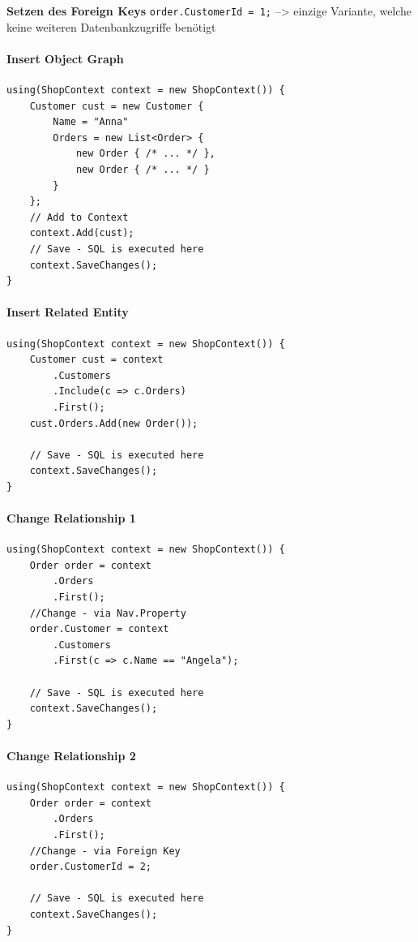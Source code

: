 \documentclass[
a4paper,
oneside,
10pt,
fleqn,
headsepline,
toc=listofnumbered, 
bibliography=totocnumbered]{scrartcl}
\begin{document}
\textbf{Setzen des Foreign Keys}
\lstinline{order.CustomerId = 1;}
--> einzige Variante, welche keine weiteren Datenbankzugriffe benötigt

\paragraph{Insert Object Graph}
\begin{lstlisting}
using(ShopContext context = new ShopContext()) {
    Customer cust = new Customer {
        Name = "Anna"
        Orders = new List<Order> {
            new Order { /* ... */ },
            new Order { /* ... */ }
        }
    };
    // Add to Context
    context.Add(cust);
    // Save - SQL is executed here
    context.SaveChanges();
}
\end{lstlisting}

\paragraph{Insert Related Entity}
\begin{lstlisting}
using(ShopContext context = new ShopContext()) {
    Customer cust = context
        .Customers
        .Include(c => c.Orders)
        .First();
    cust.Orders.Add(new Order());
    
    // Save - SQL is executed here
    context.SaveChanges();
}
\end{lstlisting}

\paragraph{Change Relationship 1}
\begin{lstlisting}
using(ShopContext context = new ShopContext()) {
    Order order = context
        .Orders
        .First();
    //Change - via Nav.Property
    order.Customer = context
        .Customers
        .First(c => c.Name == "Angela");
    
    // Save - SQL is executed here
    context.SaveChanges();
}
\end{lstlisting}

\paragraph{Change Relationship 2}
\begin{lstlisting}
using(ShopContext context = new ShopContext()) {
    Order order = context
        .Orders
        .First();
    //Change - via Foreign Key
    order.CustomerId = 2;
    
    // Save - SQL is executed here
    context.SaveChanges();
}
\end{lstlisting}
\end{document}
